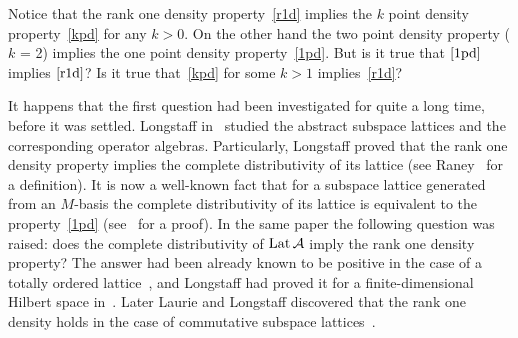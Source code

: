 \documentclass[12pt,oneside,a4paper]{amsart}
\begin{document}
  Notice that the rank one density property~\eqref{r1d} implies the $k$ point density property~\eqref{kpd} for any $k > 0$.
  On the other hand the two point density property ($k$ = 2) implies the one point density property~\eqref{1pd}.
  But is it true that $\eqref{1pd}$ implies $\eqref{r1d}$?
  Is it true that~\eqref{kpd} for some $k > 1$ implies~\eqref{r1d}?

  It happens that the first question had been investigated for quite a long time, before it was settled.
  Long\-staff in~\cite{longstaff} studied the abstract subspace lattices and the corresponding operator algebras.
  Particularly, Longstaff proved that the rank one density property implies
    the complete distributivity of its lattice (see Raney~\cite{raney} for a definition).
  It is now a well-known fact that for a subspace lattice generated from an $M$-basis
    the complete distributivity of its lattice is equivalent to
    the property~\eqref{1pd} (see~\cite{argyroslambrou} for a proof).
  In the same paper the following question was raised: does the complete distributivity of $\operatorname{Lat}\mathcal{A}$ imply the rank one density property?
  The answer had been already known to be positive in the case of a totally ordered lattice~\cite{erdos}, and
    Longstaff had proved it for a finite-dimensional Hilbert space in~\cite{longstaff}.
  Later Laurie and Longstaff discovered that the rank one density holds in the case of commutative subspace lattices~\cite{laurielongstaff}.
\end{document}
